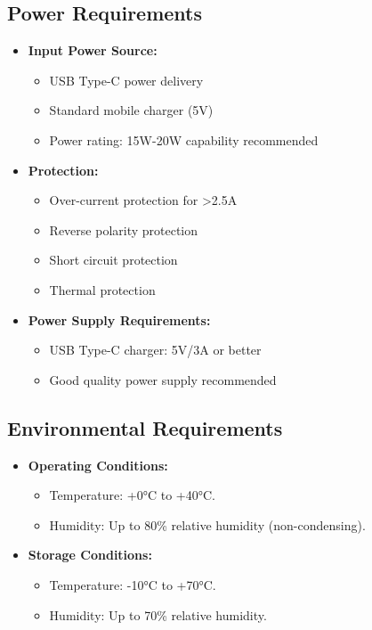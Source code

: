 \documentclass[a4paper,12pt]{article}
\begin{document}
\subsection{Power Requirements}
\begin{itemize}
    \item \textbf{Input Power Source:}
    \begin{itemize}
        \item USB Type-C power delivery
        \item Standard mobile charger (5V)
        \item Power rating: 15W-20W capability recommended
    \end{itemize}
    \item \textbf{Protection:}
    \begin{itemize}
        \item Over-current protection for >2.5A
        \item Reverse polarity protection
        \item Short circuit protection
        \item Thermal protection
    \end{itemize}
    \item \textbf{Power Supply Requirements:}
    \begin{itemize}
        \item USB Type-C charger: 5V/3A or better
        \item Good quality power supply recommended
    \end{itemize}
\end{itemize}

\subsection{Environmental Requirements}
\begin{itemize}
    \item \textbf{Operating Conditions:}
    \begin{itemize}
        \item Temperature: +0°C to +40°C.
        \item Humidity: Up to 80\% relative humidity (non-condensing).
    \end{itemize}
    \item \textbf{Storage Conditions:}
    \begin{itemize}
        \item Temperature: -10°C to +70°C.
        \item Humidity: Up to 70\% relative humidity.
    \end{itemize}
\end{itemize}
\end{document}
